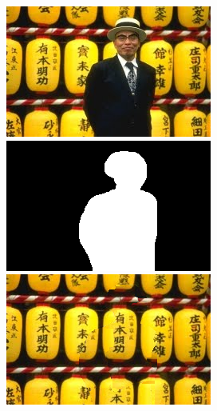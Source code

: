 \documentclass[a4paper, 10pt]{article}
\begin{document}
\begin{figure}
\begin{minipage}{.4\textwidth}
\centering
\includegraphics[scale=0.5]{images/asiatic.jpg}
\end{minipage}%
\begin{minipage}{.4\textwidth}
\centering
\includegraphics[scale=0.5]{images/asiatic_mask.png}
\end{minipage}%
\begin{minipage}{.4\textwidth}
\centering
\includegraphics[scale=0.6]{inpainted/bench_asiatique29.png}
\end{minipage}%
\end{figure}
\end{document}
